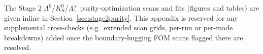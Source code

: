 
The Stage 2 $\Lambda^0$/$K_S^0$/$\Lambda_c^+$ purity-optimization scans and
fits (figures and tables) are given inline in
Section~\ref{sec:stage2purity}. This appendix is reserved for any
supplemental cross-checks (e.g.\ extended scan grids, per-run or
per-mode breakdowns) added once the boundary-hugging FOM scans flagged
there are resolved.

